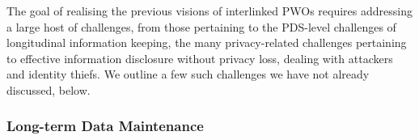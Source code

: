 \documentclass{acm_proc_article-sp}
\begin{document}




The goal of realising the previous visions of interlinked PWOs requires addressing a large host of challenges, from those pertaining to the PDS-level challenges of longitudinal information keeping, the many privacy-related challenges pertaining to effective information disclosure without privacy loss, dealing with attackers and identity thiefs.  We outline a few such challenges we have not already discussed, below.

\subsubsection{Long-term Data Maintenance}
\end{document}
